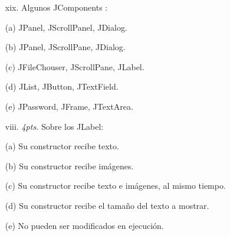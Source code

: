 \documentclass[10pt]{article}
\begin{document}
{\begin{enumerate}
\begin{multicols}{2}
    \begin{enumerate}[label=(\alph*)]
        \item[xix.] Algunos JComponents : 
        \item[(a)] JPanel, JScrollPanel, JDialog.
        \item[(b)] JPanel, JScrollPane, JDialog.
        \item[(c)] JFileChouser, JScrollPane, JLabel.
        \item[(d)] JList, JButton, JTextField.
        \item[(e)] JPassword, JFrame, JTextArea.
    \end{enumerate}

    \begin{enumerate}[label=(\alph*)]
        \item[viii.] \emph{4pts.} Sobre los JLabel: 
        \item[(a)] Su constructor recibe texto.
        \item[(b)] Su constructor recibe im\'agenes.
        \item[(c)] Su constructor recibe texto e im\'agenes, al mismo tiempo.
        \item[(d)] Su constructor recibe el tama\~no del texto a mostrar.
        \item[(e)] No pueden ser modificados en ejecuci\'on.
    \end{enumerate}

\end{multicols}

\end{enumerate}
}
\end{document}
